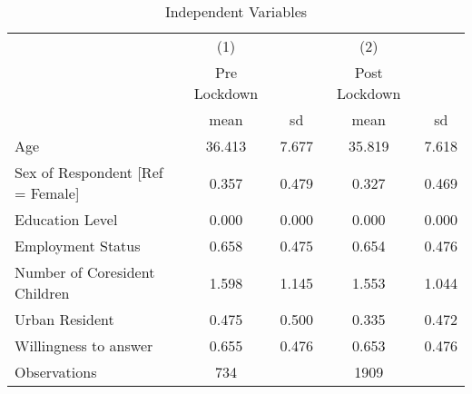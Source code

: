 \begin{table}[htbp]\centering
\def\sym#1{\ifmmode^{#1}\else\(^{#1}\)\fi}
\caption{Independent Variables}
\begin{tabular}{l*{2}{cc}}
\hline\hline
                    &\multicolumn{1}{c}{(1)}&            &\multicolumn{1}{c}{(2)}&            \\
                    &Pre Lockdown&            &Post Lockdown&            \\
                    &        mean&          sd&        mean&          sd\\
\hline
Age                 &      36.413&       7.677&      35.819&       7.618\\
Sex of Respondent [Ref = Female]&       0.357&       0.479&       0.327&       0.469\\
Education Level     &       0.000&       0.000&       0.000&       0.000\\
Employment Status   &       0.658&       0.475&       0.654&       0.476\\
Number of Coresident Children&       1.598&       1.145&       1.553&       1.044\\
Urban Resident      &       0.475&       0.500&       0.335&       0.472\\
Willingness to answer&       0.655&       0.476&       0.653&       0.476\\
\hline
Observations        &         734&            &        1909&            \\
\hline\hline
\end{tabular}
\end{table}
